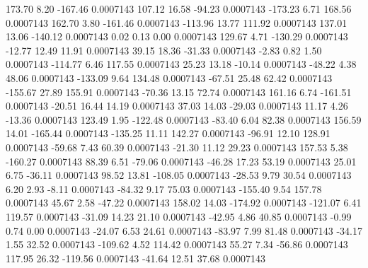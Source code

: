       173.70        8.20     -167.46     0.0007143
      107.12       16.58      -94.23     0.0007143
     -173.23        6.71      168.56     0.0007143
      162.70        3.80     -161.46     0.0007143
     -113.96       13.77      111.92     0.0007143
      137.01       13.06     -140.12     0.0007143
        0.02        0.13        0.00     0.0007143
      129.67        4.71     -130.29     0.0007143
      -12.77       12.49       11.91     0.0007143
       39.15       18.36      -31.33     0.0007143
       -2.83        0.82        1.50     0.0007143
     -114.77        6.46      117.55     0.0007143
       25.23       13.18      -10.14     0.0007143
      -48.22        4.38       48.06     0.0007143
     -133.09        9.64      134.48     0.0007143
      -67.51       25.48       62.42     0.0007143
     -155.67       27.89      155.91     0.0007143
      -70.36       13.15       72.74     0.0007143
      161.16        6.74     -161.51     0.0007143
      -20.51       16.44       14.19     0.0007143
       37.03       14.03      -29.03     0.0007143
       11.17        4.26      -13.36     0.0007143
      123.49        1.95     -122.48     0.0007143
      -83.40        6.04       82.38     0.0007143
      156.59       14.01     -165.44     0.0007143
     -135.25       11.11      142.27     0.0007143
      -96.91       12.10      128.91     0.0007143
      -59.68        7.43       60.39     0.0007143
      -21.30       11.12       29.23     0.0007143
      157.53        5.38     -160.27     0.0007143
       88.39        6.51      -79.06     0.0007143
      -46.28       17.23       53.19     0.0007143
       25.01        6.75      -36.11     0.0007143
       98.52       13.81     -108.05     0.0007143
      -28.53        9.79       30.54     0.0007143
        6.20        2.93       -8.11     0.0007143
      -84.32        9.17       75.03     0.0007143
     -155.40        9.54      157.78     0.0007143
       45.67        2.58      -47.22     0.0007143
      158.02       14.03     -174.92     0.0007143
     -121.07        6.41      119.57     0.0007143
      -31.09       14.23       21.10     0.0007143
      -42.95        4.86       40.85     0.0007143
       -0.99        0.74        0.00     0.0007143
      -24.07        6.53       24.61     0.0007143
      -83.97        7.99       81.48     0.0007143
      -34.17        1.55       32.52     0.0007143
     -109.62        4.52      114.42     0.0007143
       55.27        7.34      -56.86     0.0007143
      117.95       26.32     -119.56     0.0007143
      -41.64       12.51       37.68     0.0007143
